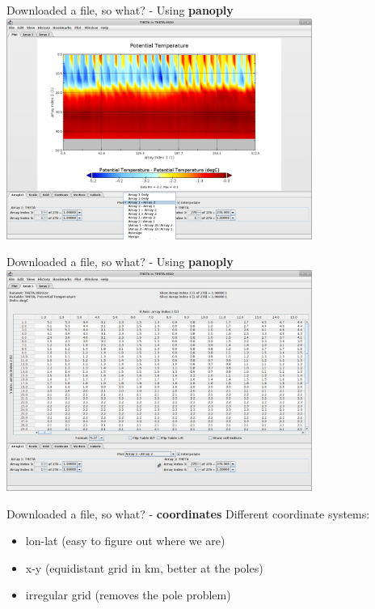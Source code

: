 \begin{frame}{\insertsectionnumber{ |} Downloaded a file, so what? - Using \textbf{panoply}}
    \centering\includegraphics[width=10cm]{images/Panoply7.png} \\
\end{frame}


\begin{frame}{\insertsectionnumber{ |} Downloaded a file, so what? - Using \textbf{panoply}}
    \centering\includegraphics[width=10cm]{images/Panoply8.png} \\
\end{frame}


\begin{frame}{\insertsectionnumber{ |} Downloaded a file, so what? - \textbf{coordinates}}
    Different coordinate systems:
        \vspace{0.3cm}
    \begin{itemize}
        \item lon-lat (easy to figure out where we are)
            \vspace{0.3cm}
        \item x-y (equidistant grid in km, better at the poles)
            \vspace{0.3cm}
        \item irregular grid (removes the pole problem)
    \end{itemize}
\end{frame}


